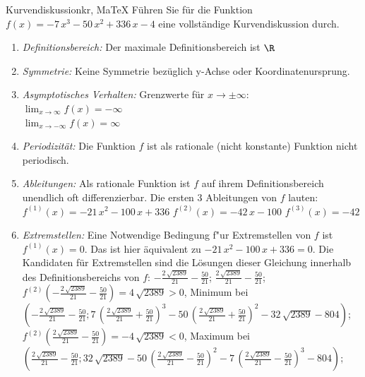  \providecommand{\MoIl}{(} 
 \providecommand{\MoIr}{)}
 \providecommand{\MIntvlSep}{;} 
 \providecommand{\MElSetSep}{;} 
 \begin{MAufgabe}{Kurvendiskussion}{kr, MaTeX}
 F\"uhren Sie f\"ur die Funktion $f(x)= - 7\, x^3 - 50\, x^2 + 336\, x - 4$ eine vollst\"andige Kurvendiskussion durch.\\ 
 \ifLsg\Loesung
 \begin{enumerate}
 \item \emph{Definitionsbereich:} 
 Der maximale Definitionsbereich ist $\R$\item \emph{Symmetrie:} 
 Keine Symmetrie bez\"uglich y-Achse oder Koordinatenursprung.\item \emph{Asymptotisches Verhalten:} 
 Grenzwerte f\"ur $x\rightarrow \pm \infty$: \\ 
 $\lim_{x\rightarrow \infty} f(x)=- \infty$ \\ 
 $\lim_{x\rightarrow -\infty} f(x)=\infty$ \\ 
 \item \emph{Periodizit\"at:} 
 Die Funktion $f$ ist als rationale (nicht konstante) Funktion nicht periodisch.\item \emph{Ableitungen:} 
 Als rationale Funktion ist $f$ auf ihrem Definitionsbereich unendlich oft differenzierbar. 
 Die ersten 3 Ableitungen von $f$ lauten: \\ 
 $f^{(1)}(x)= - 21\, x^2 - 100\, x + 336$\newline 
  $f^{(2)}(x)= - 42\, x - 100$\newline 
  $f^{(3)}(x)=-42$\newline 
  \item \emph{Extremstellen:} 
 Eine Notwendige Bedingung f"ur Extremstellen von $f$ ist $f^{(1)}(x)=0$. 
 Das ist hier \"aquivalent zu $ - 21\, x^2 - 100\, x + 336=0$. 
 Die Kandidaten f\"ur Extremstellen sind die L\"osungen dieser Gleichung innerhalb des Definitionsbereichs von $f$: $ - \frac{2\, \sqrt{2389}}{21} - \frac{50}{21}$; $\frac{2\, \sqrt{2389}}{21} - \frac{50}{21}$; \\ 
 $f^{(2)}( - \frac{2\, \sqrt{2389}}{21} - \frac{50}{21})=4\, \sqrt{2389}$$>0$, Minimum bei $( - \frac{2\, \sqrt{2389}}{21} - \frac{50}{21};7\, {\left(\frac{2\, \sqrt{2389}}{21} + \frac{50}{21}\right)}^3 - 50\, {\left(\frac{2\, \sqrt{2389}}{21} + \frac{50}{21}\right)}^2 - 32\, \sqrt{2389} - 804)$; \\ 
 $f^{(2)}(\frac{2\, \sqrt{2389}}{21} - \frac{50}{21})=- 4\, \sqrt{2389}$$<0$, Maximum bei $(\frac{2\, \sqrt{2389}}{21} - \frac{50}{21};32\, \sqrt{2389} - 50\, {\left(\frac{2\, \sqrt{2389}}{21} - \frac{50}{21}\right)}^2 - 7\, {\left(\frac{2\, \sqrt{2389}}{21} - \frac{50}{21}\right)}^3 - 804)$; \\ 

\end{enumerate}
\end{MAufgabe}
